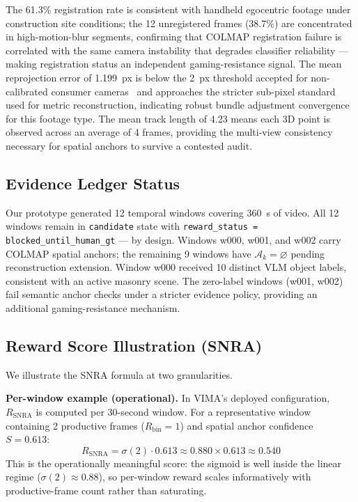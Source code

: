\documentclass[sigconf,nonacm]{acmart}
\begin{document}
The 61.3\% registration rate is consistent with handheld egocentric footage under
construction site conditions; the 12 unregistered frames (38.7\%) are
concentrated in high-motion-blur segments, confirming that COLMAP registration
failure is correlated with the same camera instability that degrades classifier
reliability --- making registration status an independent gaming-resistance signal.
The mean reprojection error of 1.199~px is below the 2~px threshold accepted for
non-calibrated consumer cameras~\cite{schonberger2016colmap} and approaches
the stricter sub-pixel standard used for metric reconstruction, indicating robust
bundle adjustment convergence for this footage type.
The mean track length of 4.23 means each 3D point is observed across an average
of 4 frames, providing the multi-view consistency necessary for spatial anchors
to survive a contested audit.

\subsection{Evidence Ledger Status}

Our prototype generated 12 temporal windows covering 360~s of video. All 12
windows remain in \texttt{candidate} state with \texttt{reward\_status =
blocked\_until\_human\_gt} --- by design. Windows w000, w001, and w002 carry
COLMAP spatial anchors; the remaining 9 windows have $\mathcal{A}_k = \varnothing$
pending reconstruction extension. Window w000 received 10 distinct VLM object
labels, consistent with an active masonry scene. The zero-label windows (w001,
w002) fail semantic anchor checks under a stricter evidence policy, providing an
additional gaming-resistance mechanism.

\subsection{Reward Score Illustration (SNRA)}

We illustrate the SNRA formula at two granularities.

\textbf{Per-window example (operational).}
In VIMA's deployed configuration, $R_{\text{SNRA}}$ is computed per 30-second
window.  For a representative window containing 2 productive frames
($R_{\text{bin}} = 1$) and spatial anchor confidence $S = 0.613$:
\begin{equation}
  R_{\text{SNRA}} = \sigma(2) \cdot 0.613 \approx 0.880 \times 0.613 \approx 0.540
\end{equation}
This is the operationally meaningful score: the sigmoid is well inside the
linear regime ($\sigma(2) \approx 0.88$), so per-window reward scales
informatively with productive-frame count rather than saturating.
\end{document}
